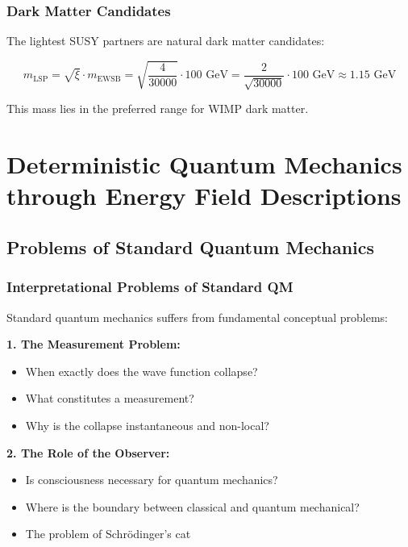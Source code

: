 \documentclass[12pt,a4paper]{report}
\newcommand{\xipar}{\xi}      %
\begin{document}
	\subsection{Dark Matter Candidates}\label{subsec:dark_matter_candidates}
	
	The lightest SUSY partners are natural dark matter candidates:
	
	\begin{equation}\label{eq:dm_mass}
		m_{\text{LSP}} = \sqrt{\xipar} \cdot m_{\text{EWSB}} = \sqrt{\frac{4}{30000}} \cdot 100 \text{ GeV} = \frac{2}{\sqrt{30000}} \cdot 100 \text{ GeV} \approx 1.15 \text{ GeV}
	\end{equation}
	
	This mass lies in the preferred range for WIMP dark matter.
	\chapter{Deterministic Quantum Mechanics through Energy Field Descriptions}\label{chap:deterministic_qm}
	
	\section{Problems of Standard Quantum Mechanics}\label{sec:qm_problems}
	
	\subsection{Interpretational Problems of Standard QM}\label{subsec:interpretational_problems}
	
	Standard quantum mechanics suffers from fundamental conceptual problems:
	
	\textbf{1. The Measurement Problem:}
	\begin{itemize}
		\item When exactly does the wave function collapse?
		\item What constitutes a measurement?
		\item Why is the collapse instantaneous and non-local?
	\end{itemize}
	
	\textbf{2. The Role of the Observer:}
	\begin{itemize}
		\item Is consciousness necessary for quantum mechanics?
		\item Where is the boundary between classical and quantum mechanical?
		\item The problem of Schrödinger's cat
	\end{itemize}
	
\end{document}
